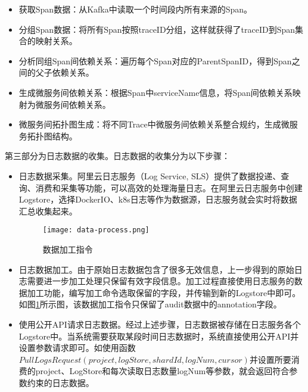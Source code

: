 \begin{itemize}
    \item [（1）]获取Span数据：从Kafka中读取一个时间段内所有来源的Span。
    \item [（2）]分组Span数据：将所有Span按照traceID分组，这样就获得了traceID到Span集合的映射关系。
    \item [（3）]分析同组Span间依赖关系：遍历每个Span对应的ParentSpanID，得到Span之间的父子依赖关系。
    \item [（4）]生成微服务间依赖关系：根据Span中serviceName信息，将Span间依赖关系映射为微服务间依赖关系。
    \item [（5）]微服务间拓扑图生成：将不同Trace中微服务间依赖关系整合规约，生成微服务拓扑图结构。
\end{itemize}






第三部分为日志数据的收集。日志数据的收集分为以下步骤：
\begin{itemize}
    \item [（1）]日志数据采集。阿里云日志服务（Log Service, SLS）提供了数据投递、查询、消费和采集等功能，可以高效的处理海量日志。在阿里云日志服务中创建Logstore，选择DockerIO、k8s日志等作为数据源，日志服务就会实时将数据汇总收集起来。
    \begin{figure}[htbp]
        \centering
        \texttt{[image: data-process.png]}
        \caption{数据加工指令\label{data-process}}
    \end{figure}
    \item [（2）]日志数据加工。由于原始日志数据包含了很多无效信息，上一步得到的原始日志需要进一步加工处理只保留有效字段信息。加工过程直接使用日志服务的数据加工功能，编写加工命令选取保留的字段，并传输到新的Logstore中即可。如图\ref{data-process}所示图，该数据加工指令只保留了audit数据中的annotation字段。
    \item [（3）]使用公开API请求日志数据。经过上述步骤，日志数据被存储在日志服务各个Logstore中。当系统需要获取某段时间日志数据时，系统直接使用公开API并设置参数请求即可。如使用函数$PullLogsRequest(project, logStore, shardId, logNum, cursor)$并设置所要消费的project、LogStore和每次读取日志数量logNum等参数，就会返回符合参数约束的日志数据。
\end{itemize}

